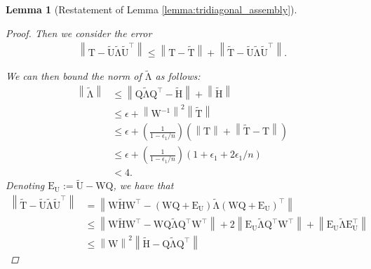 \documentclass{article}
\newcommand{\lnorm}{\left\|}
\newcommand{\rnorm}{\right\|}
\newcommand{\lpar}{\left(}
\newcommand{\rpar}{\right)}
\newtheorem{lemma}{Lemma}[section]
\newcommand\matE{\boldsymbol{\mathrm{E}}}
\newcommand\matQ{\boldsymbol{\mathrm{Q}}}
\newcommand\matT{\boldsymbol{\mathrm{T}}}
\newcommand\matU{\boldsymbol{\mathrm{U}}}
\newcommand\matW{\boldsymbol{\mathrm{W}}}
\newcommand\matHtilde{\widetilde{\boldsymbol{\mathrm{H}}}}
\newcommand\matTtilde{\widetilde{\boldsymbol{\mathrm{T}}}}
\newcommand\matUtilde{\widetilde{\boldsymbol{\mathrm{U}}}}
\newcommand\matLambdatilde{\widetilde{\boldsymbol{\mathrm{\Lambda}}}}
\begin{document}
\begin{lemma}[Restatement of Lemma \ref{lemma:tridiagonal_assembly}]
\begin{proof}
        Then we consider the error
        \begin{align*}
            \lnorm\matT-\matUtilde\matLambdatilde\matUtilde^\top\rnorm
            \leq
            \lnorm\matT-\matTtilde\rnorm + \lnorm\matTtilde-\matUtilde\matLambdatilde\matUtilde^\top\rnorm.
        \end{align*}
        

        We can then bound the norm of $\matLambdatilde$ as follows:
        \begingroup
        \allowdisplaybreaks
        \begin{align*}
            \lnorm\matLambdatilde\rnorm
            &\leq 
            \lnorm\matQ\matLambdatilde\matQ^\top  - \matHtilde \rnorm
            + 
            \lnorm\matHtilde\rnorm
            \\
            &\leq 
            \epsilon + \lnorm\matW^{-1}\rnorm^2 \lnorm\matTtilde\rnorm
            \\
            &\leq 
            \epsilon + (\tfrac{1}{1-\epsilon_1/n})
            \lpar \lnorm\matT\rnorm + \lnorm\matTtilde-\matT\rnorm\rpar
            \\
            &\leq 
            \epsilon + (\tfrac{1}{1-\epsilon_1/n})\lpar1+\epsilon_1+2\epsilon_1/n\rpar
            \\
            &< 4.
        \end{align*}
        \endgroup
        Denoting $\matE_{\matU}:=\matUtilde-\matW\matQ$, we have that
        \begin{align*}
            \lnorm 
                \matTtilde-\matUtilde\matLambdatilde\matUtilde^\top
            \rnorm
            &=
            \lnorm
                \matW\matHtilde\matW^\top
                -
                (\matW\matQ+\matE_{\matU})\matLambdatilde(\matW\matQ+\matE_{\matU})^\top
            \rnorm
            \\
            &\leq
            \lnorm
                \matW\matHtilde\matW^\top
                -
                \matW\matQ\matLambdatilde\matQ^\top\matW^\top
            \rnorm
                +
            2
            \lnorm
                \matE_{\matU}\matLambdatilde\matQ^\top \matW^\top
            \rnorm
            +
            \lnorm
                \matE_{\matU}\matLambdatilde\matE_{\matU}^\top
            \rnorm
            \\
            &\leq
            \lnorm
                \matW
            \rnorm^2
            \lnorm 
            \matHtilde
                -
                \matQ\matLambdatilde\matQ^\top
            \rnorm

\end{align*}
\end{proof}
\end{lemma}
\end{document}
